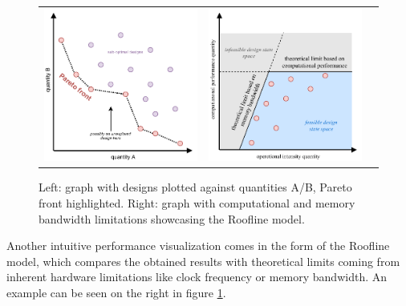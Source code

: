\begin{figure}[!hpt]
  \centering
  \begin{tabular}{ccc}
      {\includegraphics[width=0.44\columnwidth]{background/pareto.pdf}} &
      {\includegraphics[width=0.44\columnwidth]{background/roofline.pdf}}
  \end{tabular}
  \caption{Left: graph with designs plotted against quantities A/B, Pareto front highlighted. Right: graph with computational and memory bandwidth limitations showcasing the Roofline model.}
  \label{fig:pareto-roofline}
\end{figure}

Another intuitive performance visualization comes in the form of the Roofline model, which compares the obtained results with theoretical limits coming from inherent hardware limitations like clock frequency or memory bandwidth. An example can be seen on the right in figure \ref{fig:pareto-roofline}.